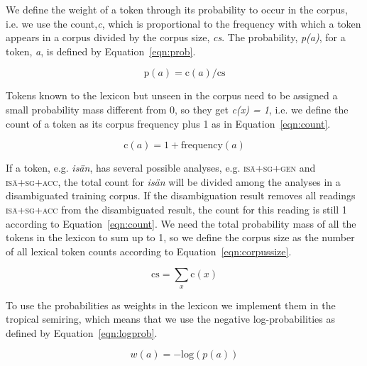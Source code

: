 \documentclass[postprint]{flammie}
\begin{document}
We define the weight of a token through its probability to occur in
the corpus, i.e. we use the count,\emph{c}, which is proportional to
the frequency with which a token appears in a corpus divided by the
corpus size, \emph{cs}. The probability, \emph{p(a)}, for a token,
\emph{a}, is defined by Equation~\ref{eqn:prob}.

\begin{small}
  \begin{equation}
    \label{eqn:prob}
    \mathrm{p}(a) = \mathrm{c}(a)/\mathrm{cs}
  \end{equation}
\end{small}

Tokens known to the lexicon but unseen in the corpus need to be
assigned a small probability mass different from 0, so they get
\emph{c(x) = 1}, i.e. we define the count of a token as its corpus
frequency plus 1 as in Equation~\ref{eqn:count}.

\begin{small}
  \begin{equation}
    \label{eqn:count}
    \mathrm{c}(a) = 1 + \mathrm{frequency}(a)
  \end{equation}
\end{small}

If a token, e.g. \emph{isän}, has several possible analyses, e.g.
\textsc{isä+sg+gen} and \textsc{isä+sg+acc}, the total count for
\emph{isän} will be divided among the analyses in a disambiguated
training corpus. If the disambiguation result removes all readings
\textsc{isä+sg+acc} from the disambiguated result, the count for this
reading is still 1 according to Equation~\ref{eqn:count}. We need the
total probability mass of all the tokens in the lexicon to sum up to
1, so we define the corpus size as the number of all lexical token
counts according to Equation~\ref{eqn:corpussize}.

\begin{small}
  \begin{equation}
    \label{eqn:corpussize}
    \mathrm{cs} = \sum_{x} \mathrm{c}(x)
  \end{equation}
\end{small}

To use the probabilities as weights in the lexicon we implement them in
the tropical semiring, which means that we use the negative
log-probabilities as defined by Equation~\ref{eqn:logprob}.

\begin{small}
  \begin{equation}
    \label{eqn:logprob}
    w(a) = -\mathrm{log}(p(a))
  \end{equation}
\end{small}
\end{document}
